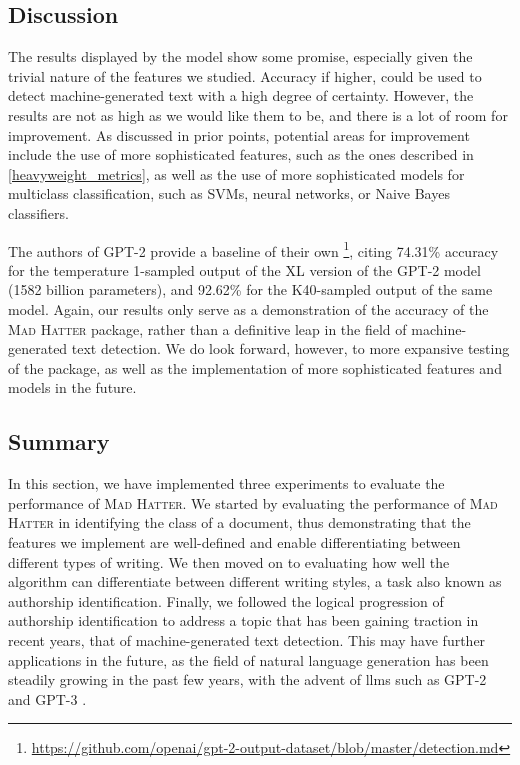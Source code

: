 \subsection*{Discussion}
The results displayed by the model show some promise, especially given the trivial nature of the features we studied. Accuracy if higher, could be used to detect machine-generated text with a high degree of certainty. However, the results are not as high as we would like them to be, and there is a lot of room for improvement. As discussed in prior points, potential areas for improvement include the use of more sophisticated features, such as the ones described in \ref{heavyweight_metrics}, as well as the use of more sophisticated models for multiclass classification, such as SVMs, neural networks, or Naive Bayes classifiers.

The authors of GPT-2 provide a baseline of their own \footnote{\url{https://github.com/openai/gpt-2-output-dataset/blob/master/detection.md}}, citing 74.31\% accuracy for the temperature 1-sampled output of the XL version of the GPT-2 model (1582 billion
parameters), and 92.62\% for the K40-sampled output of the same model. Again, our results only serve as a demonstration of the accuracy of the \textsc{Mad Hatter} package, rather than a definitive leap in the field of machine-generated text detection. We do look forward, however, to more expansive testing of the package, as well as the implementation of more sophisticated features and models in the future.

\subsection{Summary}
In this section, we have implemented three experiments to evaluate the performance of \textsc{Mad Hatter}. We started by evaluating the performance of \textsc{Mad Hatter} in identifying the class of a document, thus demonstrating that the features we implement are well-defined and enable differentiating between different types of writing. We then moved on to evaluating how well the algorithm can differentiate between different writing styles, a task also known as authorship identification. Finally, we followed the logical progression of authorship identification to address a topic that has been gaining traction in recent years, that of machine-generated text detection. This may have further applications in the future, as the field of natural language generation has been steadily growing in the past few years, with the advent of \acrshort{llm}s such as GPT-2 \citep{radford2019_gpt2} and GPT-3 \citep{brown_gpt3_2020}. 
